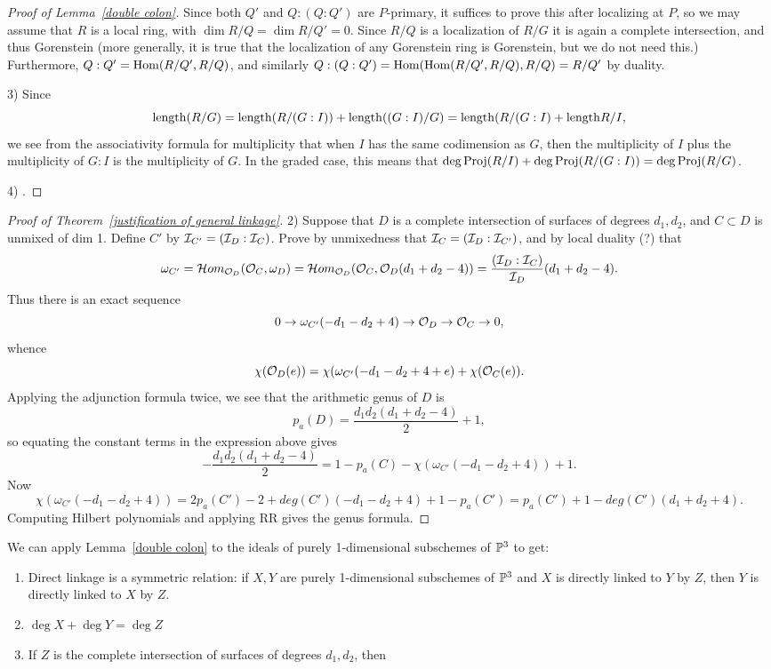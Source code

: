 \begin{proof}[Proof of Lemma~\ref{double colon}]
  Since both $Q'$ and $Q:(Q:Q')$ are $P$-primary, it suffices to prove this after localizing at $P$, so we may assume
  that $R$ is a local ring, with $\dim R/Q = \dim R/Q' = 0$. Since $R/Q$ is a localization of $R/G$ it is again a complete
  intersection, and thus Gorenstein (more generally, it is true that the localization of any Gorenstein ring is Gorenstein, but
  we do not need this.)
  Furthermore, $Q:Q' = \operatorname{Hom}(R/Q', R/Q)$, and similarly $Q:(Q:Q') = \operatorname{Hom}(\operatorname{Hom}(R/Q', R/Q), R/Q) = R/Q'$ by duality.
  
3) Since 
$$
{\rm length} (R/G) = {\rm length}(R/(G:I))+{\rm length}((G:I)/G) = {\rm length}(R/(G:I) +{\rm length} R/I,
$$ we see from the associativity formula for multiplicity that when $I$ has the same codimension as $G$, then the multiplicity of $I$ plus the
multiplicity of $G:I$ is the multiplicity of $G$. In the graded case, this means that
$\deg \operatorname{Proj}(R/I) +\deg \operatorname{Proj}(R/(G:I)) = \deg \operatorname{Proj}(R/G)$.

4) .
\end{proof}

 \begin{proof}[Proof of Theorem~\ref{justification of general linkage}
] 2) Suppose that $D$ is a complete intersection of surfaces of degrees $d_1,d_2$, and 
$C\subset D$ is unmixed of dim 1. Define $C'$ by ${\mathcal I}_{C'} = ({\mathcal I}_D:{\mathcal I}_C)$. Prove by unmixedness that 
${\mathcal I}_C = ({\mathcal I}_D:{\mathcal I}_{C'})$,  and by local duality (?) that 
$$
\omega_{C'} = \mathcal{H}om_{{\mathcal O}_D}({\mathcal O}_C, \omega_D) = 
\mathcal{H}om_{{\mathcal O}_D}({\mathcal O}_C, {\mathcal O}_D(d_1+d_2-4))
=  \frac{({\mathcal I}_D:{\mathcal I}_C)}{{\mathcal I}_{D}}(d_1+d_2-4).
$$
Thus there is an exact sequence
$$
0\to \omega_{C'}(-d_1-d_2+4) \to {\mathcal O}_D \to {\mathcal O}_C \to 0,
$$
whence
$$
 \chi({\mathcal O}_D(e)) =
 \chi(\omega_{C'}(-d_1-d_2+4+e) +
 \chi({\mathcal O}_C(e)).
 $$
 Applying the adjunction formula twice, we see that the arithmetic genus of $D$ is
 $$
 p_a(D) = \frac{d_1d_2(d_1+d_2-4)}{2}+1,
 $$
 so equating the constant terms in the expression above
 gives
 $$
 - \frac{d_1d_2(d_1+d_2-4)}{2} = 
1-p_a(C) -
\chi(\omega_{C'}(-d_1-d_2+4))+1.
$$
Now 
$$
\chi(\omega_{C'}(-d_1-d_2+4)) = 2p_a(C') -2 + deg(C')(-d_1-d_2+4) + 1- p_a(C')
= p_a(C')+1- deg(C')(d_1+d_2+4).
$$
Computing Hilbert polynomials and applying RR gives the genus formula.

 \end{proof}

We can apply Lemma~\ref{double colon} to the ideals of purely 1-dimensional subschemes of ${\mathbb P}^{3}$ to get:
\begin{corollary}
\begin{enumerate}
\item Direct linkage is a symmetric relation: if $X,Y$ are purely 1-dimensional subschemes of ${\mathbb P}^{3}$ and $X$ is directly linked to $Y$ by $Z$, then
$Y$ is directly linked to $X$ by $Z$. 
\item $\deg X+\deg Y = \deg Z$
\item If $Z$ is the complete intersection of surfaces of degrees $d_{1}, d_{2}$, then

\end{enumerate}
\end{corollary}

